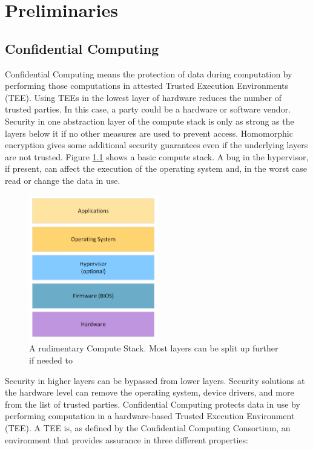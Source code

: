 \chapter{Preliminaries}
\label{ch:Foundations}

\section{Confidential Computing}
\label{sec:Foundations:ConfComputing}
Confidential Computing means the protection of data during computation by performing those computations in attested Trusted Execution Environments (TEE). Using TEEs in the lowest layer of hardware reduces the number of trusted parties. In this case, a party could be a hardware or software vendor. Security in one abstraction layer of the compute stack is only as strong as the layers below it if no other measures are used to prevent access. Homomorphic encryption gives some additional security guarantees even if the underlying layers are not trusted. Figure \ref{fig:computestack} shows a basic compute stack. A bug in the hypervisor, if present, can affect the execution of the operating system and, in the worst case read or change the data in use.
\begin{figure}
\centering
\includegraphics[width=0.5\textwidth]{figures/ComputeStack.png}
\caption{A rudimentary Compute Stack. Most layers can be split up further if needed to}
\label{fig:computestack}
\end{figure}Security in higher layers can be bypassed from lower layers. Security solutions at the hardware level can remove the operating system, device drivers, and more from the list of trusted parties. Confidential Computing protects data in use by performing computation in a hardware-based Trusted Execution Environment (TEE). A TEE is, as defined by the Confidential Computing Consortium, an environment that provides assurance in three different properties:
